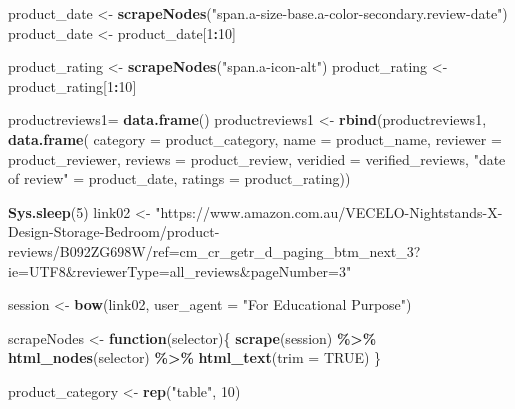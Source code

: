 \documentclass[
]{article}
\newenvironment{Shaded}{\begin{snugshade}}{\end{snugshade}}
\newcommand{\AttributeTok}[1]{\textcolor[rgb]{0.13,0.29,0.53}{#1}}
\newcommand{\ConstantTok}[1]{\textcolor[rgb]{0.56,0.35,0.01}{#1}}
\newcommand{\ControlFlowTok}[1]{\textcolor[rgb]{0.13,0.29,0.53}{\textbf{#1}}}
\newcommand{\DecValTok}[1]{\textcolor[rgb]{0.00,0.00,0.81}{#1}}
\newcommand{\FunctionTok}[1]{\textcolor[rgb]{0.13,0.29,0.53}{\textbf{#1}}}
\newcommand{\NormalTok}[1]{#1}
\newcommand{\OtherTok}[1]{\textcolor[rgb]{0.56,0.35,0.01}{#1}}
\newcommand{\SpecialCharTok}[1]{\textcolor[rgb]{0.81,0.36,0.00}{\textbf{#1}}}
\newcommand{\StringTok}[1]{\textcolor[rgb]{0.31,0.60,0.02}{#1}}
\begin{document}
\begin{Shaded}
\begin{Highlighting}[]
\NormalTok{  product\_date }\OtherTok{\textless{}{-}} \FunctionTok{scrapeNodes}\NormalTok{(}\StringTok{"span.a{-}size{-}base.a{-}color{-}secondary.review{-}date"}\NormalTok{)}
\NormalTok{  product\_date }\OtherTok{\textless{}{-}}\NormalTok{ product\_date[}\DecValTok{1}\SpecialCharTok{:}\DecValTok{10}\NormalTok{]}
  
\NormalTok{  product\_rating }\OtherTok{\textless{}{-}} \FunctionTok{scrapeNodes}\NormalTok{(}\StringTok{"span.a{-}icon{-}alt"}\NormalTok{)}
\NormalTok{  product\_rating }\OtherTok{\textless{}{-}}\NormalTok{ product\_rating[}\DecValTok{1}\SpecialCharTok{:}\DecValTok{10}\NormalTok{]}
  
\NormalTok{  productreviews1}\OtherTok{=} \FunctionTok{data.frame}\NormalTok{()}
\NormalTok{  productreviews1 }\OtherTok{\textless{}{-}} \FunctionTok{rbind}\NormalTok{(productreviews1, }\FunctionTok{data.frame}\NormalTok{(}
                      \AttributeTok{category =}\NormalTok{ product\_category,}
                      \AttributeTok{name =}\NormalTok{ product\_name,}
                      \AttributeTok{reviewer =}\NormalTok{ product\_reviewer,}
                      \AttributeTok{reviews =}\NormalTok{ product\_review,}
                      \AttributeTok{veridied =}\NormalTok{ verified\_reviews,}
                      \StringTok{"date of review"} \OtherTok{=}\NormalTok{ product\_date,}
                      \AttributeTok{ratings =}\NormalTok{ product\_rating))}

  
 \FunctionTok{Sys.sleep}\NormalTok{(}\DecValTok{5}\NormalTok{)}
\NormalTok{link02 }\OtherTok{\textless{}{-}} \StringTok{"https://www.amazon.com.au/VECELO{-}Nightstands{-}X{-}Design{-}Storage{-}Bedroom/product{-}reviews/B092ZG698W/ref=cm\_cr\_getr\_d\_paging\_btm\_next\_3?ie=UTF8\&reviewerType=all\_reviews\&pageNumber=3"}


\NormalTok{  session }\OtherTok{\textless{}{-}} \FunctionTok{bow}\NormalTok{(link02,}
               \AttributeTok{user\_agent =} \StringTok{"For Educational Purpose"}\NormalTok{)}

\NormalTok{  scrapeNodes }\OtherTok{\textless{}{-}} \ControlFlowTok{function}\NormalTok{(selector)\{}
    \FunctionTok{scrape}\NormalTok{(session) }\SpecialCharTok{\%\textgreater{}\%}
      \FunctionTok{html\_nodes}\NormalTok{(selector) }\SpecialCharTok{\%\textgreater{}\%}
      \FunctionTok{html\_text}\NormalTok{(}\AttributeTok{trim =} \ConstantTok{TRUE}\NormalTok{)}
\NormalTok{  \}}

\NormalTok{  product\_category }\OtherTok{\textless{}{-}} \FunctionTok{rep}\NormalTok{(}\StringTok{"table"}\NormalTok{, }\DecValTok{10}\NormalTok{)}


\end{Highlighting}
\end{Shaded}
\end{document}

